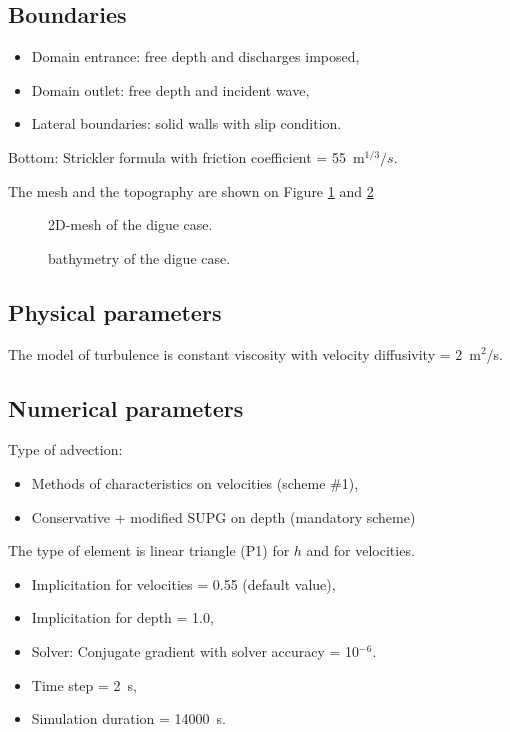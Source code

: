 \subsection{Boundaries}

\begin{itemize}
\item Domain entrance: free depth and discharges imposed,
\item Domain outlet: free depth and incident wave,
\item Lateral boundaries: solid walls with slip condition.
\end{itemize}

Bottom: Strickler formula with friction coefficient = 55~m$^{1/3}/s$.

The mesh and the topography are shown on Figure \ref{fig:digue:Mesh} and \ref{fig:digue:Bathy}

\begin{figure}[H]
 \centering
  \caption{2D-mesh of the digue case.}\label{fig:digue:Mesh}
\end{figure}


\begin{figure}[H]
 \centering
  \caption{bathymetry of the digue case.}\label{fig:digue:Bathy}
\end{figure}

\subsection{Physical parameters}

The model of turbulence is constant viscosity
with velocity diffusivity = 2~m$^2$/s.

\subsection{Numerical parameters}
Type of advection:
\begin{itemize}
\item Methods of characteristics on velocities (scheme \#1),
\item Conservative + modified SUPG on depth (mandatory scheme)
\end{itemize}

The type of element is linear triangle (P1) for $h$ and for velocities.

\begin{itemize}
\item Implicitation for velocities = 0.55 (default value),
\item Implicitation for depth = 1.0,
\item Solver: Conjugate gradient with solver accuracy = 10$^{-6}$.
\item Time step = 2~s,
\item Simulation duration = 14000~s.
\end{itemize}

